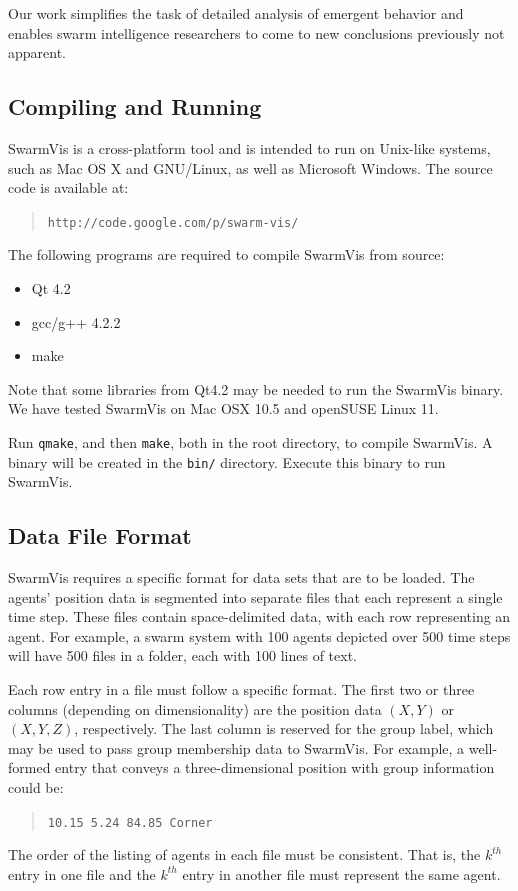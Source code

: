 \documentclass{vgtc}
\begin{document}
Our work simplifies the task of detailed analysis of emergent behavior and
enables swarm intelligence researchers to come to new conclusions previously not apparent.




\vspace{50pt}


\pagebreak


\subsection{Compiling and Running}
SwarmVis is a cross-platform tool
and is intended to run on Unix-like systems, such as Mac OS X and GNU/Linux, as well as Microsoft Windows.
The source code is available at:\begin{quote}\texttt{http://code.google.com/p/swarm-vis/}\end{quote}
The following programs are required to compile SwarmVis from source:
\begin{itemize}
\item Qt 4.2
\item gcc/g++ 4.2.2
\item make
\end{itemize}
Note that some libraries from Qt4.2 may be needed to run the SwarmVis binary.
We have tested SwarmVis on Mac OSX 10.5 and openSUSE Linux 11.

Run \texttt{qmake}, and then \texttt{make}, both in the root directory, to compile SwarmVis.
A binary will be created in the \texttt{bin/} directory. Execute this binary to run SwarmVis.

\subsection{Data File Format}
SwarmVis requires a specific format for data sets that are to be loaded. The agents' position data is segmented into
separate files that each represent a single time step. These files contain space-delimited data, with
each row representing an agent. For example, a swarm system with 100 agents depicted over 500 time steps
will have 500 files in a folder, each with 100 lines of text.

Each row entry in a file must follow a specific format. The first two or three  columns (depending on dimensionality) are the
position data $(X, Y)$ or $(X, Y, Z)$, respectively. The last column is reserved for the group label, which may be used to pass
group membership data to SwarmVis.
For example, a well-formed entry that conveys a three-dimensional position with group information could be:
\begin{quote}
\texttt{10.15 5.24 84.85 Corner}
\end{quote}
The order of the listing of agents in each file must be consistent.
That is, the $k^{th}$ entry in one file and the $k^{th}$ entry in another file must represent the same agent.
\end{document}
